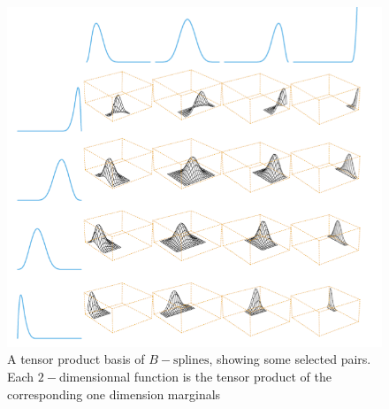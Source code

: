 \begin{figure}[H]
	\begin{center}
		\includegraphics[width=\textwidth]{./chap/1chap/3sec/8images/2_tensorProduct.PNG}
	\end{center}
	\caption{A tensor product basis of $B-\text{splines}$, showing some selected pairs. Each
	$2-$dimensionnal function is the tensor product of the corresponding one dimension 
	marginals}
	\label{fig: 2_tensorProduct.PNG}
\end{figure}

